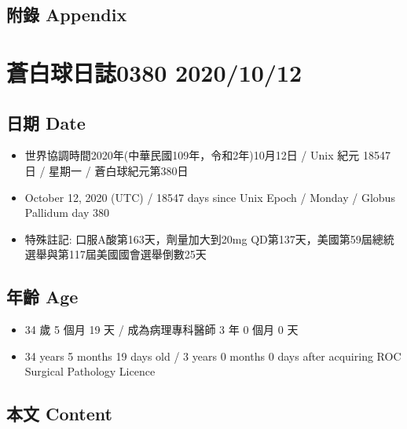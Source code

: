 \documentclass[
]{article}
\providecommand{\tightlist}{%
  \setlength{\itemsep}{0pt}\setlength{\parskip}{0pt}}
\begin{document}
\hypertarget{ux9644ux9304-appendix-37}{%
\subsection{附錄 Appendix}\label{ux9644ux9304-appendix-37}}

\hypertarget{ux84bcux767dux7403ux65e5ux8a8c0380-20201012}{%
\section{蒼白球日誌0380
2020/10/12}\label{ux84bcux767dux7403ux65e5ux8a8c0380-20201012}}

\hypertarget{ux65e5ux671f-date-38}{%
\subsection{日期 Date}\label{ux65e5ux671f-date-38}}

\begin{itemize}
\tightlist
\item
  世界協調時間2020年(中華民國109年，令和2年)10月12日 / Unix 紀元 18547
  日 / 星期一 / 蒼白球紀元第380日
\item
  October 12, 2020 (UTC) / 18547 days since Unix Epoch / Monday / Globus
  Pallidum day 380
\item
  特殊註記: 口服A酸第163天，劑量加大到20mg
  QD第137天，美國第59屆總統選舉與第117屆美國國會選舉倒數25天
\end{itemize}

\hypertarget{ux5e74ux9f61-age-38}{%
\subsection{年齡 Age}\label{ux5e74ux9f61-age-38}}

\begin{itemize}
\tightlist
\item
  34 歲 5 個月 19 天 / 成為病理專科醫師 3 年 0 個月 0 天
\item
  34 years 5 months 19 days old / 3 years 0 months 0 days after
  acquiring ROC Surgical Pathology Licence
\end{itemize}

\hypertarget{ux672cux6587-content-38}{%
\subsection{本文 Content}\label{ux672cux6587-content-38}}
\end{document}

